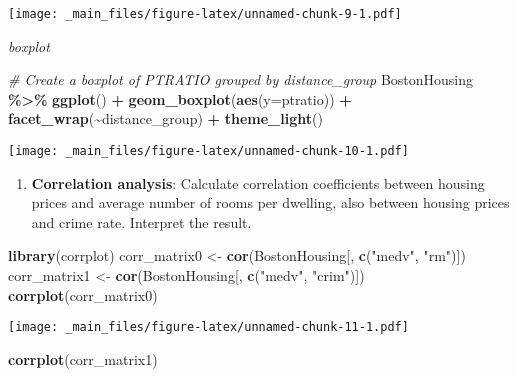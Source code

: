 \documentclass[
]{book}
\newenvironment{Shaded}{\begin{snugshade}}{\end{snugshade}}
\newcommand{\AttributeTok}[1]{\textcolor[rgb]{0.13,0.29,0.53}{#1}}
\newcommand{\CommentTok}[1]{\textcolor[rgb]{0.56,0.35,0.01}{\textit{#1}}}
\newcommand{\FunctionTok}[1]{\textcolor[rgb]{0.13,0.29,0.53}{\textbf{#1}}}
\newcommand{\NormalTok}[1]{#1}
\newcommand{\OtherTok}[1]{\textcolor[rgb]{0.56,0.35,0.01}{#1}}
\newcommand{\SpecialCharTok}[1]{\textcolor[rgb]{0.81,0.36,0.00}{\textbf{#1}}}
\newcommand{\StringTok}[1]{\textcolor[rgb]{0.31,0.60,0.02}{#1}}
\providecommand{\tightlist}{%
  \setlength{\itemsep}{0pt}\setlength{\parskip}{0pt}}
\begin{document}
\texttt{[image: \_main\_files/figure-latex/unnamed-chunk-9-1.pdf]}

\emph{boxplot}

\begin{Shaded}
\begin{Highlighting}[]
\CommentTok{\# Create a boxplot of PTRATIO grouped by distance\_group}
\NormalTok{BostonHousing }\SpecialCharTok{\%\textgreater{}\%} \FunctionTok{ggplot}\NormalTok{() }\SpecialCharTok{+} 
\FunctionTok{geom\_boxplot}\NormalTok{(}\FunctionTok{aes}\NormalTok{(}\AttributeTok{y=}\NormalTok{ptratio)) }\SpecialCharTok{+}
  \FunctionTok{facet\_wrap}\NormalTok{(}\SpecialCharTok{\textasciitilde{}}\NormalTok{distance\_group) }\SpecialCharTok{+}
  \FunctionTok{theme\_light}\NormalTok{()}
\end{Highlighting}
\end{Shaded}

\texttt{[image: \_main\_files/figure-latex/unnamed-chunk-10-1.pdf]}

\begin{enumerate}
\def\labelenumi{\arabic{enumi}.}
\setcounter{enumi}{7}
\tightlist
\item
  \textbf{Correlation analysis}: Calculate correlation coefficients between housing prices and average number of rooms per dwelling, also between housing prices and crime rate. Interpret the result.
\end{enumerate}

\begin{Shaded}
\begin{Highlighting}[]
\FunctionTok{library}\NormalTok{(corrplot)}
\NormalTok{corr\_matrix0 }\OtherTok{\textless{}{-}} \FunctionTok{cor}\NormalTok{(BostonHousing[, }\FunctionTok{c}\NormalTok{(}\StringTok{"medv"}\NormalTok{, }\StringTok{"rm"}\NormalTok{)])}
\NormalTok{corr\_matrix1 }\OtherTok{\textless{}{-}} \FunctionTok{cor}\NormalTok{(BostonHousing[, }\FunctionTok{c}\NormalTok{(}\StringTok{"medv"}\NormalTok{, }\StringTok{"crim"}\NormalTok{)])}
\FunctionTok{corrplot}\NormalTok{(corr\_matrix0)}
\end{Highlighting}
\end{Shaded}

\texttt{[image: \_main\_files/figure-latex/unnamed-chunk-11-1.pdf]}

\begin{Shaded}
\begin{Highlighting}[]
\FunctionTok{corrplot}\NormalTok{(corr\_matrix1)}
\end{Highlighting}
\end{Shaded}
\end{document}
